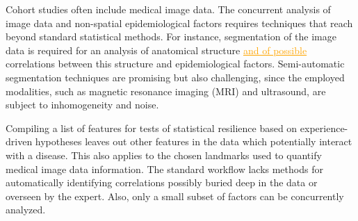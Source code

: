 \documentclass[journal]{style/vgtc} 			          %
\newcommand{\com}[1]{\textcolor{orange}{\uline{#1}}}
\begin{document}
Cohort studies often include medical image data.
% 
The concurrent analysis of image data and non-spatial epidemiological factors requires techniques that reach beyond standard statistical methods.
%
For instance, segmentation of the image data is required for an analysis of anatomical structure \com{and of possible} correlations between this structure and epidemiological factors.
%
Semi-automatic segmentation techniques are promising but also challenging, since the employed modalities, such as magnetic resonance imaging (MRI) and ultrasound, are subject to inhomogeneity and noise.
%

Compiling a list of features for tests of statistical resilience based on experience-driven hypotheses leaves out other features in the data which potentially interact with a disease.
%
This also applies to the chosen landmarks used to quantify medical image data information.
%
%
The standard workflow lacks methods for automatically identifying correlations possibly buried deep in the data or overseen by the expert.
%
Also, only a small subset of factors can be concurrently analyzed.
%
\end{document}
